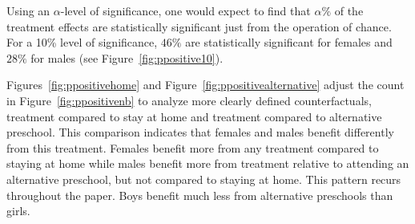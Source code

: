 Using an $\alpha$-level of significance, one would expect to find that $\alpha\%$ of the treatment effects are statistically significant just from the operation of chance. For a 10\% level of significance, $46\%$ are statistically significant for females and $28\%$ for males (see Figure~\ref{fig:ppositive10}).

Figures~\ref{fig:ppositivehome} and Figure~\ref{fig:ppositivealternative} adjust the count in Figure~\ref{fig:ppositivenb} to analyze more clearly defined counterfactuals, treatment compared to stay at home and treatment compared to alternative preschool. This comparison indicates that females and males benefit differently from this treatment. Females benefit more from any treatment compared to staying at home while males benefit more from treatment relative to attending an alternative preschool, but not compared to staying at home. This pattern recurs throughout the paper. Boys benefit much less from alternative preschools than girls.

